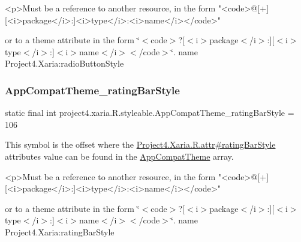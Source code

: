 \begin{DoxyVerb}      <p>Must be a reference to another resource, in the form "<code>@[+][<i>package</i>:]<i>type</i>:<i>name</i></code>"
\end{DoxyVerb}
 or to a theme attribute in the form \char`\"{}$<$code$>$?\mbox{[}$<$i$>$package$<$/i$>$\+:\mbox{]}\mbox{[}$<$i$>$type$<$/i$>$\+:\mbox{]}$<$i$>$name$<$/i$>$$<$/code$>$\char`\"{}.  name Project4.\+Xaria\+:radio\+Button\+Style \mbox{\label{classproject4_1_1xaria_1_1R_1_1styleable_a89d18e267c360b44756771f540ab88f2}} 
\subsubsection{\texorpdfstring{App\+Compat\+Theme\+\_\+rating\+Bar\+Style}{AppCompatTheme\_ratingBarStyle}}
{\footnotesize\ttfamily static final int project4.\+xaria.\+R.\+styleable.\+App\+Compat\+Theme\+\_\+rating\+Bar\+Style = 106\hspace{0.3cm}{\ttfamily [static]}}

This symbol is the offset where the \hyperlink{}{Project4.\+Xaria.\+R.\+attr\#rating\+Bar\+Style} attribute\textquotesingle{}s value can be found in the \hyperlink{classproject4_1_1xaria_1_1R_1_1styleable_aad8bec413e2350f9404e6ff0e831a85d}{App\+Compat\+Theme} array.

\begin{DoxyVerb}      <p>Must be a reference to another resource, in the form "<code>@[+][<i>package</i>:]<i>type</i>:<i>name</i></code>"
\end{DoxyVerb}
 or to a theme attribute in the form \char`\"{}$<$code$>$?\mbox{[}$<$i$>$package$<$/i$>$\+:\mbox{]}\mbox{[}$<$i$>$type$<$/i$>$\+:\mbox{]}$<$i$>$name$<$/i$>$$<$/code$>$\char`\"{}.  name Project4.\+Xaria\+:rating\+Bar\+Style \mbox{\label{classproject4_1_1xaria_1_1R_1_1styleable_af3937cdc8aa3bd4b266711ff72f3eebb}} 
